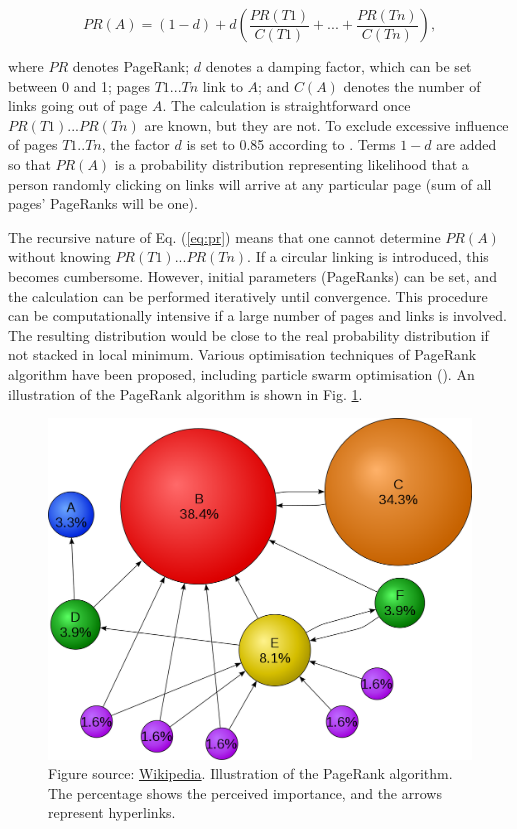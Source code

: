 \documentclass[11pt]{article}
\begin{document}
\begin{small}
\begin{equation}
 PR(A) = (1-d) + d \left(\frac{PR(T1)}{C(T1)} + ... + \frac{PR(Tn)}{C(Tn)}\right),
 \label{eq:pr}
\end{equation}
\end{small}
where $PR$ denotes PageRank; $d$ denotes a damping factor, which can be set between 0 and 1; pages $T1...Tn$ link to $A$; and $C(A)$ denotes the number of links going out of page $A$. The calculation is straightforward once $PR(T1)...PR(Tn)$ are known, but they are not. To exclude excessive influence of pages $T1..Tn$, the factor $d$ is set to 0.85 according to \citet{rogers2002google}. Terms $1-d$ are added so that $PR(A)$ is a probability distribution representing likelihood that a person randomly clicking on links will arrive at any particular page (sum of all pages' PageRanks will be one).

The recursive nature of Eq. (\ref{eq:pr}) means that one cannot determine $PR(A)$ without knowing $PR(T1)...PR(Tn)$. If a circular linking is introduced, this becomes cumbersome. However, initial parameters (PageRanks) can be set, and the calculation can be performed iteratively until convergence. This procedure can be computationally intensive if a large number of pages and links is involved. The resulting distribution would be close to the real probability distribution if not stacked in local minimum. Various optimisation techniques of PageRank algorithm have been proposed, including particle swarm optimisation (\citet{bastos2021inverse}).  An illustration of the PageRank algorithm is shown in Fig. \ref{fig:PR}.

\begin{figure}[!h]
\centering
\includegraphics[scale = 0.175]{../figures/PR.png}
\caption{Figure source: \href{https://en.wikipedia.org/wiki/File:PageRanks-Example.svg}{Wikipedia}. Illustration of the PageRank algorithm. The percentage shows the perceived importance, and the arrows represent hyperlinks.\label{fig:PR}}
\end{figure}
\end{document}
